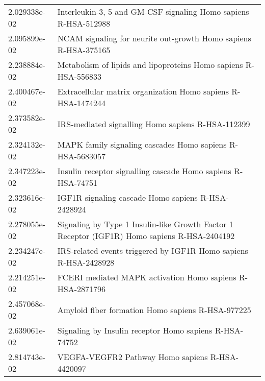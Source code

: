 \begin{longtable}{p{2.4cm}p{14.5cm}}
             2.029338e-02 &                                                           Interleukin-3, 5 and GM-CSF signaling Homo sapiens R-HSA-512988 \\
             2.095899e-02 &                                                           NCAM signaling for neurite out-growth Homo sapiens R-HSA-375165 \\
             2.238884e-02 &                                                           Metabolism of lipids and lipoproteins Homo sapiens R-HSA-556833 \\
             2.400467e-02 &                                                              Extracellular matrix organization Homo sapiens R-HSA-1474244 \\
             2.373582e-02 &                                                                         IRS-mediated signalling Homo sapiens R-HSA-112399 \\
             2.324132e-02 &                                                                 MAPK family signaling cascades Homo sapiens R-HSA-5683057 \\
             2.347223e-02 &                                                              Insulin receptor signalling cascade Homo sapiens R-HSA-74751 \\
             2.323616e-02 &                                                                        IGF1R signaling cascade Homo sapiens R-HSA-2428924 \\
             2.278055e-02 &                              Signaling by Type 1 Insulin-like Growth Factor 1 Receptor (IGF1R) Homo sapiens R-HSA-2404192 \\
             2.234247e-02 &                                                          IRS-related events triggered by IGF1R Homo sapiens R-HSA-2428928 \\
             2.214251e-02 &                                                                 FCERI mediated MAPK activation Homo sapiens R-HSA-2871796 \\
             2.457068e-02 &                                                                         Amyloid fiber formation Homo sapiens R-HSA-977225 \\
             2.639061e-02 &                                                                    Signaling by Insulin receptor Homo sapiens R-HSA-74752 \\
             2.814743e-02 &                                                                           VEGFA-VEGFR2 Pathway Homo sapiens R-HSA-4420097 \\

\end{longtable}
